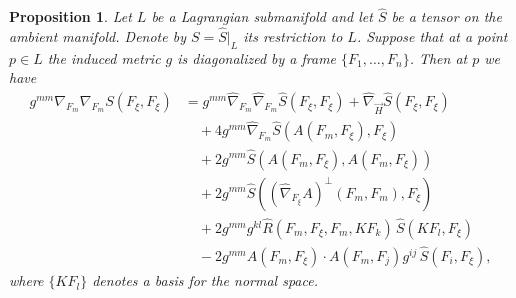 \documentclass[12pt,letterpaper]{amsart}%
\newcounter{mycounter}
\numberwithin{mycounter}{section}
\theoremstyle{plain}
\newtheorem{proposition}[mycounter]{Proposition}
\numberwithin{equation}{section}
\theoremstyle{definition}
\newcommand{\maxidx}{\mathord{\xi}} %
\begin{document}
\begin{proposition}
Let $L$ be a Lagrangian submanifold and let $\hat S$ be a tensor on the ambient manifold. 
Denote by $S=\hat S|_L$ its restriction to $L$. Suppose that at a point $p\in L$ the induced metric $g$ is diagonalized by a frame 
$\{F_1,\dots,F_n\}$. Then at $p$ we have
\begin{align*}
g^{mm}\nabla_{F_m}\nabla_{F_m}S(F_{\maxidx},F_{\maxidx})
&= g^{mm}\hat\nabla_{F_m}\hat\nabla_{F_m}\hat S(F_{\maxidx},F_{\maxidx})
   + \hat\nabla_{\vec H}\hat S(F_{\maxidx},F_{\maxidx}) \\
&\quad + 4g^{mm}\hat\nabla_{F_m}\hat S(A(F_m,F_{\maxidx}),F_{\maxidx}) \\
&\quad + 2g^{mm}\hat S(A(F_m,F_{\maxidx}),A(F_m,F_{\maxidx})) \\
&\quad + 2g^{mm}\hat S\!\left((\hat\nabla_{F_{\maxidx}}A)^{\perp}(F_m,F_m),F_{\maxidx}\right) \\
&\quad + 2g^{mm}g^{kl}\hat R(F_m,F_{\maxidx},F_m,KF_k)\,\hat S(KF_l,F_{\maxidx}) \\
&\quad - 2g^{mm}A(F_m,F_{\maxidx})\cdot A(F_m,F_j)g^{ij}\,\hat S(F_i,F_{\maxidx}),
\end{align*}
where $\{KF_l\}$ denotes a basis for the normal space.
\end{proposition}
\end{document}
